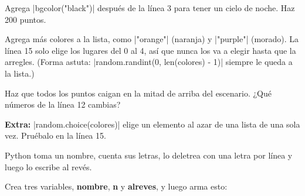 \begin{challenge}
\tick Agrega \py|bgcolor("black")| después de la línea 3 para tener un cielo de noche. Haz 200 puntos.\par
\tick Agrega más colores a la lista, como \py|"orange"| (naranja) y \py|"purple"| (morado). La línea 15 solo elige los lugares del 0 al 4, así que nunca los va a elegir hasta que la arregles. (Forma astuta: \py|random.randint(0, len(colores) - 1)| siempre le queda a la lista.)\par
\tick Haz que todos los puntos caigan en la mitad de arriba del escenario. ¿Qué números de la línea 12 cambias?\par
\tick \textbf{Extra:} \py|random.choice(colores)| elige un elemento al azar de una lista de una sola vez. Pruébalo en la línea 15.
\end{challenge}


Python toma un nombre, cuenta sus letras, lo deletrea con una letra por línea y luego lo escribe al revés.

Crea tres variables, \textbf{nombre}, \textbf{n} y \textbf{alreves}, y luego arma esto:

\begin{center}
\begin{scratch}
\end{scratch}
\end{center}

